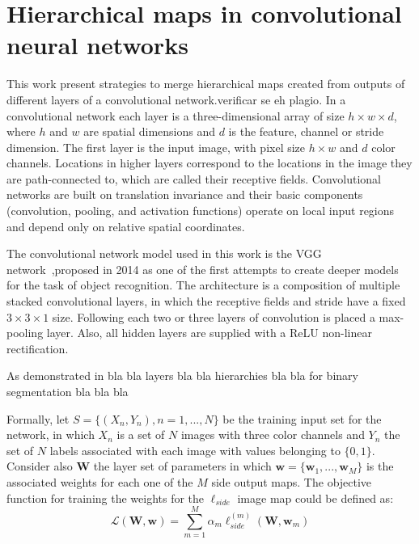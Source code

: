 \section{Hierarchical maps in convolutional neural networks}
\label{sec:method}

This work present strategies to merge hierarchical maps created from  outputs of different layers of a convolutional network.{\color{green}verificar se eh plagio}. In a convolutional network each layer is a three-dimensional array of size $h \times w \times d$, where $h$ and $w$ are spatial dimensions  and $d$ is the feature, channel or stride dimension. The first layer is the input image, with pixel size $h \times w$ and $d$ color channels. Locations in higher layers correspond to the locations in the image they are path-connected to, which are called their receptive fields. Convolutional networks are built on translation invariance and their basic components (convolution, pooling, and activation functions) operate on local input regions and depend only on relative spatial coordinates. 

The convolutional network model used in this work is the VGG network~\cite{simonyan2014},proposed in 2014 as one of the first attempts to create deeper models for the task of object recognition. The architecture is a composition of multiple stacked convolutional layers, in which the receptive fields and stride have a fixed $3\times3\times1$ size. Following each two or three layers of convolution is placed a max-pooling layer. Also, all hidden layers are supplied with a ReLU non-linear rectification.

As demonstrated in bla bla layers bla bla hierarchies bla bla for binary segmentation bla bla bla

Formally, let $\mathit{S}=\{(\mathit{X_n,Y_n}), \mathit{n}=1,...,\mathit{N}\}$ be the training input set for the network, in which $\mathit{X_n}$ is a set of $\mathit{N}$ images with three color channels and $\mathit{Y_n}$ the set of $\mathit{N}$ labels associated with each image with values belonging to $\{0,1\}$. Consider also $\mathbf{W}$ the layer set of parameters in which
$\mathbf{w}=\{\mathbf{w}_1,...,\mathbf{w}_M\}$ is the associated weights for each one of the $\mathit{M}$ side output maps. The objective function for training the weights for the $\ell_{side}$ image map could be defined as:
\begin{equation}
\mathcal{L}(\mathbf{W},\mathbf{w})=\sum_{m=1}^M\alpha_m\ell_{side}^{(m)}(\mathbf{W},\mathbf{w}_m)
\end{equation}
